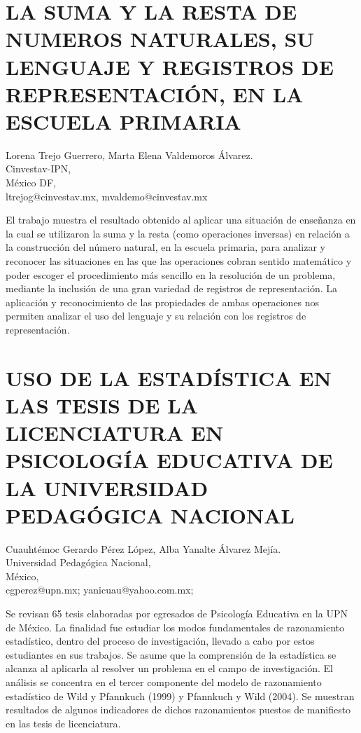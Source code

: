 \section{LA SUMA Y LA RESTA DE NUMEROS NATURALES, SU LENGUAJE Y REGISTROS
DE REPRESENTACIÓN, EN LA ESCUELA PRIMARIA }

\begin{datos}
Lorena Trejo Guerrero, Marta Elena Valdemoros Álvarez.\\
Cinvestav-IPN,\\
\hfill México DF, \\
\hfill ltrejog@cinvestav.mx, mvaldemo@cinvestav.mx 
\end{datos}

El trabajo muestra el resultado obtenido al aplicar una situación
de enseñanza en la cual se utilizaron la suma y la resta (como operaciones
inversas) en relación a la construcción del número natural, en la
escuela primaria, para analizar y reconocer las situaciones en las
que las operaciones cobran sentido matemático y poder escoger el procedimiento
más sencillo en la resolución de un problema, mediante la inclusión
de una gran variedad de registros de representación. La aplicación
y reconocimiento de las propiedades de ambas operaciones nos permiten
analizar el uso del lenguaje y su relación con los registros de representación. 


\section{USO DE LA ESTADÍSTICA EN LAS TESIS DE LA LICENCIATURA EN PSICOLOGÍA
EDUCATIVA DE LA UNIVERSIDAD PEDAGÓGICA NACIONAL}

\begin{datos}
Cuauhtémoc Gerardo Pérez López, Alba Yanalte Álvarez Mejía.\\
Universidad Pedagógica Nacional,\\
\hfill México, \\
\hfill cgperez@upn.mx; yanicuau@yahoo.com.mx; 
\end{datos}

Se revisan 65 tesis elaboradas por egresados de Psicología Educativa
en la UPN de México. La finalidad fue estudiar los modos fundamentales
de razonamiento estadístico, dentro del proceso de investigación,
llevado a cabo por estos estudiantes en sus trabajos. Se asume que
la comprensión de la estadística se alcanza al aplicarla al resolver
un problema en el campo de investigación. El análisis se concentra
en el tercer componente del modelo de razonamiento estadístico de
Wild y Pfannkuch (1999) y Pfannkuch y Wild (2004). Se muestran resultados
de algunos indicadores de dichos razonamientos puestos de manifiesto
en las tesis de licenciatura.



